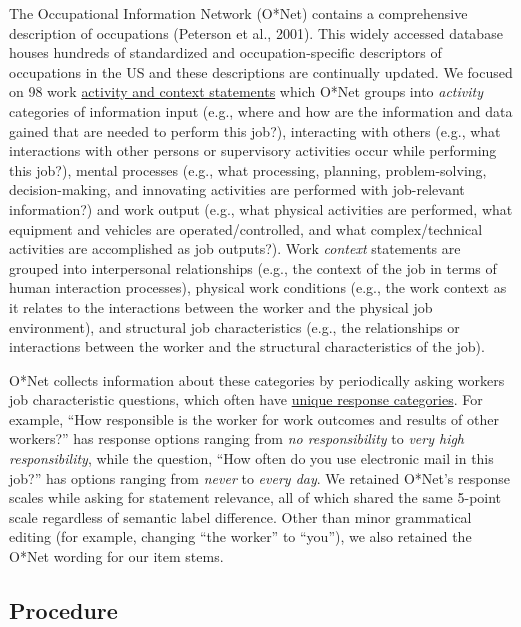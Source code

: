 \documentclass[
  man,mask]{apa7}
\begin{document}
The Occupational Information Network (O*Net) contains a comprehensive description of occupations (Peterson et al., 2001). This widely accessed database houses hundreds of standardized and occupation-specific descriptors of occupations in the US and these descriptions are continually updated. We focused on 98 work \href{https://www.ONETonline.org/find/descriptor/result/4.A.1.b.3}{activity and context statements} which O*Net groups into \emph{activity} categories of information input (e.g., where and how are the information and data gained that are needed to perform this job?), interacting with others (e.g., what interactions with other persons or supervisory activities occur while performing this job?), mental processes (e.g., what processing, planning, problem-solving, decision-making, and innovating activities are performed with job-relevant information?) and work output (e.g., what physical activities are performed, what equipment and vehicles are operated/controlled, and what complex/technical activities are accomplished as job outputs?). Work \emph{context} statements are grouped into interpersonal relationships (e.g., the context of the job in terms of human interaction processes), physical work conditions (e.g., the work context as it relates to the interactions between the worker and the physical job environment), and structural job characteristics (e.g., the relationships or interactions between the worker and the structural characteristics of the job).

O*Net collects information about these categories by periodically asking workers job characteristic questions, which often have \href{https://www.ONETonline.org/find/descriptor/result/4.C.1.c.2}{unique response categories}. For example, ``How responsible is the worker for work outcomes and results of other workers?'' has response options ranging from \emph{no responsibility} to \emph{very high responsibility}, while the question, ``How often do you use electronic mail in this job?'' has options ranging from \emph{never} to \emph{every day}. We retained O*Net's response scales while asking for statement relevance, all of which shared the same 5-point scale regardless of semantic label difference. Other than minor grammatical editing (for example, changing ``the worker'' to ``you''), we also retained the O*Net wording for our item stems.

\hypertarget{procedure}{%
\subsection{Procedure}\label{procedure}}
\end{document}
